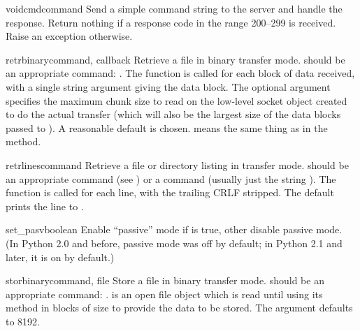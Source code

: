 \begin{methoddesc}[FTP]{voidcmd}{command}
Send a simple command string to the server and handle the response.
Return nothing if a response code in the range 200--299 is received.
Raise an exception otherwise.
\end{methoddesc}

\begin{methoddesc}[FTP]{retrbinary}{command,
    callback}
Retrieve a file in binary transfer mode.   should be an
appropriate  command: .
The  function is called for each block of data received,
with a single string argument giving the data block.
The optional  argument specifies the maximum chunk size to
read on the low-level socket object created to do the actual transfer
(which will also be the largest size of the data blocks passed to
).  A reasonable default is chosen.  means the
same thing as in the  method.
\end{methoddesc}

\begin{methoddesc}[FTP]{retrlines}{command}
Retrieve a file or directory listing in \ASCII{} transfer mode.
 should be an appropriate  command (see
) or a  command (usually just the string
).  The  function is called for each line,
with the trailing CRLF stripped.  The default  prints
the line to .
\end{methoddesc}

\begin{methoddesc}[FTP]{set_pasv}{boolean}
Enable ``passive'' mode if  is true, other disable
passive mode.  (In Python 2.0 and before, passive mode was off by
default; in Python 2.1 and later, it is on by default.)
\end{methoddesc}

\begin{methoddesc}[FTP]{storbinary}{command, file}
Store a file in binary transfer mode.   should be an
appropriate  command: .
 is an open file object which is read until \EOF{} using its
 method in blocks of size  to provide the
data to be stored.  The  argument defaults to 8192.
\end{methoddesc}

